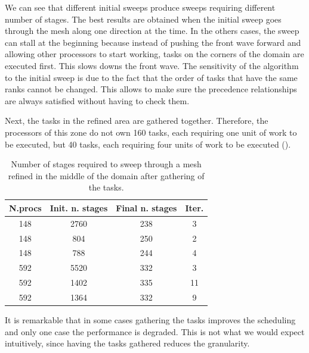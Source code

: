 \documentclass[letterpaper]{article}
\renewcommand{\(}{\left(}
\renewcommand{\)}{\right)}
\renewcommand{\[}{\left[}
\renewcommand{\]}{\right]}
\begin{document}
We can see that different initial sweeps produce sweeps requiring different
number of stages. The best results are obtained when the initial sweep goes
through the mesh along one direction at the time. In the others cases, the sweep
can stall at the beginning because instead of pushing the front wave forward and
allowing other processors to start working, tasks on the corners of the domain
are executed first. This slows downs the front wave. The sensitivity of the
algorithm to the initial sweep is due to the fact that the order of tasks that
have the same ranks cannot be changed. This allows to make sure the precedence
relationships are always satisfied without having to check them. 

Next, the tasks in the refined area are gathered together. Therefore, the
processors of this zone do not own 160 tasks, each requiring one unit of work to
be executed, but 40 tasks, each requiring four units of work to be executed
(). 
\begin{table}[H]
  \begin{center}
    \begin{tabular}{|c|c|c|c|}
      \hline
      N.procs & Init. n. stages & Final n. stages & Iter. \\
      \hline
      148 & 2760 & 238 & 3  \\
      148 & 804  & 250 & 2  \\
      148 & 788  & 244 & 4  \\
      592 & 5520 & 332 & 3  \\
      592 & 1402 & 335 & 11 \\
      592 & 1364 & 332 & 9  \\
      \hline
    \end{tabular}
    \caption{Number of stages required to sweep through a mesh refined in the
      middle of the domain after gathering of the tasks.}
    \label{amr_2}
  \end{center}
\end{table}

It is remarkable that in some cases gathering the tasks improves the scheduling
and only one case the performance is degraded. This is not what we would expect
intuitively, since having the tasks gathered reduces the granularity.
\end{document}
